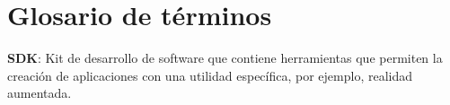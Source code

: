 \chapter{Glosario de términos}

\begin{description}
  \item \textbf{SDK}: Kit de desarrollo de software que contiene herramientas que permiten la creación de aplicaciones con una utilidad específica, por ejemplo, realidad aumentada.  
\end{description}
